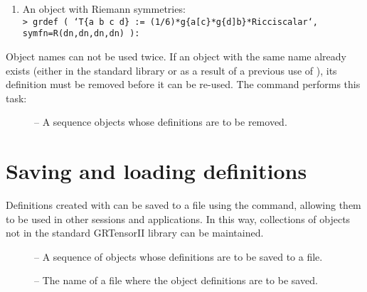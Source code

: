 \documentclass{article}
\begin{document}
{\begin{enumerate}
  \item An object with Riemann symmetries:\\

    \texttt{> grdef ( `T\{a b c d\} := (1/6)*g\{a[c\}*g\{d]b\}*Ricciscalar`,
      symfn=R(dn,dn,dn,dn) ):}
\end{enumerate}

\noindent Object names can not be used twice. If an object with the
same name already exists (either in the standard library or as
a result of a previous use of ), its definition must
be removed before it can be re-used. The  command
performs this task:\\
%
\begin{cmdspec}
  \label{spec:grundefine}

  \begin{description}
    \item[] -- A sequence objects whose definitions are
      to be removed.
  \end{description}

\end{cmdspec}
%
\section{Saving and loading definitions}
%
Definitions created with  can be saved to a file using the
 command, allowing them to be used in other sessions and
applications. In this way, collections of objects not in the standard
GRTensorII library can be maintained.\\
\begin{cmdspec}
  \label{spec:grsavedef}

  \begin{description}
    \item[] -- A sequence of objects whose definitions
      are to be saved to a file.
    \item[] -- The name of a file
      where the object definitions are to be saved.
  \end{description}

\end{cmdspec}

}
\end{document}
